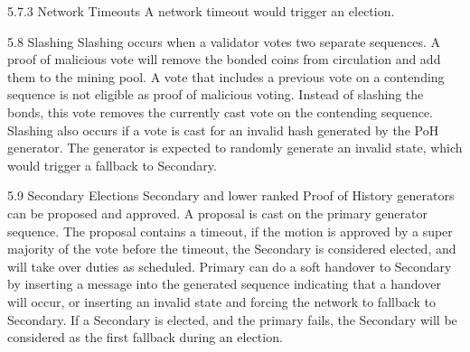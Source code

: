 \documentclass[11pt]{article}
\begin{document}
5.7.3 Network Timeouts A network timeout would trigger an election.


5.8 Slashing Slashing occurs when a validator votes two separate sequences. A proof of malicious vote will remove the bonded coins from circulation and add them to the mining pool. A vote that includes a previous vote on a contending sequence is not eligible as proof of malicious voting. Instead of slashing the bonds, this vote removes the currently cast vote on the contending sequence. Slashing also occurs if a vote is cast for an invalid hash generated by the PoH generator. The generator is expected to randomly generate an invalid state, which would trigger a fallback to Secondary.


5.9 Secondary Elections Secondary and lower ranked Proof of History generators can be proposed and approved. A proposal is cast on the primary generator sequence. The proposal contains a timeout, if the motion is approved by a super majority of the vote before the timeout, the Secondary is considered elected, and will take over duties as scheduled. Primary can do a soft handover to Secondary by inserting a message into the generated sequence indicating that a handover will occur, or inserting an invalid state and forcing the network to fallback to Secondary. If a Secondary is elected, and the primary fails, the Secondary will be considered as the first fallback during an election.
\end{document}
